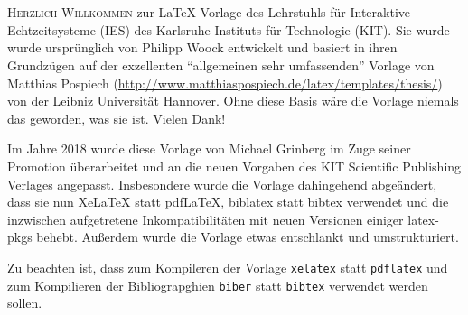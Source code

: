 \chapter*{\TransAcknowledgements}
%
%
%
\markboth{\TransAcknowledgements}{\TransAcknowledgements}
%
%
\lettrine[nindent=0.2em]{H}{erzlich Willkommen} zur \LaTeX-Vorlage des Lehrstuhls für Interaktive Echtzeitsysteme (IES) des Karlsruhe Instituts für Technologie (KIT).
Sie wurde wurde ursprünglich von Philipp Woock entwickelt und basiert in ihren Grundzügen auf der exzellenten \enquote{allgemeinen sehr umfassenden} Vorlage von Matthias Pospiech (\url{http://www.matthiaspospiech.de/latex/templates/thesis/}) von der Leibniz Universität Hannover.
Ohne diese Basis wäre die Vorlage niemals das geworden, was sie ist. Vielen Dank!

Im Jahre 2018 wurde diese Vorlage von Michael Grinberg im Zuge seiner Promotion überarbeitet und an die neuen Vorgaben des KIT Scientific Publishing Verlages angepasst.
Insbesondere wurde die Vorlage dahingehend abgeändert, dass sie nun XeLaTeX statt pdfLaTeX, \gls{biblatex} statt \gls{bibtex} verwendet und die inzwischen aufgetretene Inkompatibilitäten mit neuen Versionen einiger \gls{latex}-\glspl{pkg} behebt.
Außerdem wurde die Vorlage etwas entschlankt und umstrukturiert.

Zu beachten ist, dass zum Kompileren der Vorlage \texttt{xelatex} statt \texttt{pdflatex} und zum Kompilieren der Bibliograpghien \texttt{biber} statt \texttt{bibtex} verwendet werden sollen.
